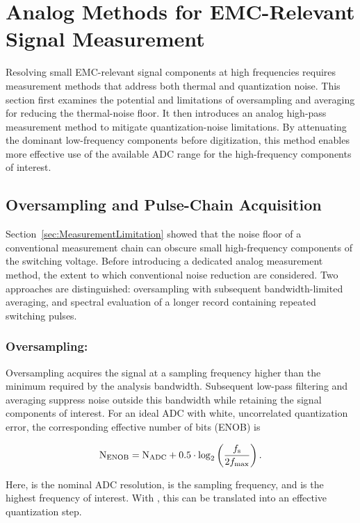 \section{Analog Methods for EMC-Relevant Signal Measurement}

Resolving small EMC-relevant signal components at high frequencies requires measurement methods that address both thermal and quantization noise.
This section first examines the potential and limitations of oversampling and averaging for reducing the thermal-noise floor.
It then introduces an analog high-pass measurement method to mitigate quantization-noise limitations.
By attenuating the dominant low-frequency components before digitization, this method enables more effective use of the available ADC range for the high-frequency components of interest.

\subsection{Oversampling and Pulse-Chain Acquisition}
Section~\ref{sec:MeasurementLimitation} showed that the noise floor of a conventional measurement chain can obscure small high-frequency components of the switching voltage.
Before introducing a dedicated analog measurement method, the extent to which conventional noise reduction are considered.
Two approaches are distinguished: oversampling with subsequent bandwidth-limited averaging, and spectral evaluation of a longer record containing repeated switching pulses.

\subsubsection*{Oversampling:}
Oversampling acquires the signal at a sampling frequency higher than the minimum required by the analysis bandwidth.
Subsequent low-pass filtering and averaging suppress noise outside this bandwidth while retaining the signal components of interest.
For an ideal ADC with white, uncorrelated quantization error, the corresponding effective number of bits (ENOB) is~\cite{silicon_laboratories_an118_2013}

\begin{equation}
	\text{N}_{\text{ENOB}} = \text{N}_{\text{ADC}} + 0.5\cdot \log_2\left(\frac{{f}_{\mathrm{s}}}{2{f}_{\mathrm{max}}}\right).
\end{equation}

Here,  is the nominal ADC resolution,  is the sampling frequency, and  is the highest frequency of interest.
With , this can be translated into an effective quantization step.

